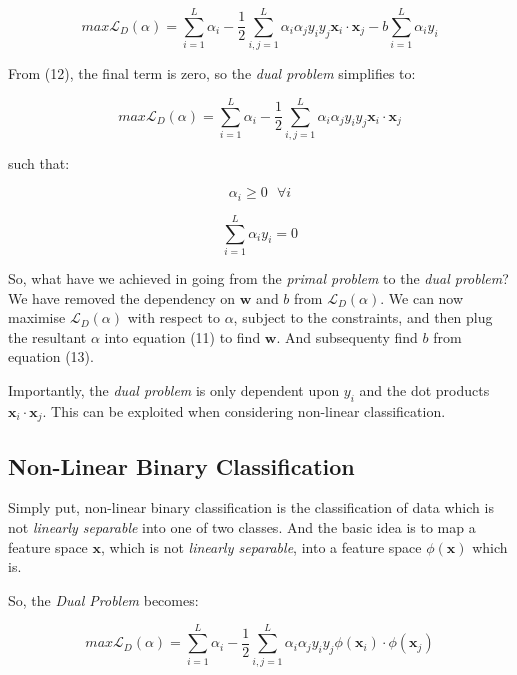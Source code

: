 \documentclass[10pt, a4paper,reqno]{amsart}
\begin{document}
\begin{equation}
max\mathcal{L}_D(\alpha) = \sum_{i=1}^{L}\alpha_i - \frac{1}{2}\sum_{i,j=1}^{L}\alpha_i \alpha_j y_i y_j\mathbf{x}_i\cdot\mathbf{x}_j - b\sum_{i=1}^{L}\alpha_i y_i
\end{equation}

From (12), the final term is zero, so the \emph{dual problem} simplifies to:

\begin{equation}
max\mathcal{L}_D(\alpha) = \sum_{i=1}^{L}\alpha_i - \frac{1}{2}\sum_{i,j=1}^{L}\alpha_i \alpha_j y_i y_j\mathbf{x}_i\cdot\mathbf{x}_j
\end{equation}

such that:

\begin{equation}
\alpha_i\geq0\text{ }\forall{i}
\end{equation}

\begin{equation}
\sum_{i=1}^{L}\alpha_i y_i = 0
\end{equation}

So, what have we achieved in going from the \emph{primal problem} to the \emph{dual problem}? We have removed the dependency on $\mathbf{w}$ and $b$ from $\mathcal{L}_D(\alpha)$. We can now maximise $\mathcal{L}_D(\alpha)$ with respect to $\alpha$, subject to the constraints, and then plug the resultant $\alpha$ into equation (11) to find $\mathbf{w}$. And subsequenty find $b$ from equation (13).

Importantly, the \emph{dual problem} is only dependent upon $y_i$ and the dot products $\mathbf{x}_i\cdot\mathbf{x}_j$. This can be exploited when considering non-linear classification.

\subsection{Non-Linear Binary Classification}

Simply put, non-linear binary classification is the classification of data which is not \emph{linearly separable} into one of two classes. And the basic idea is to map a feature space $\mathbf{x}$, which is not \emph{linearly separable}, into a feature space $\phi(\mathbf{x})$ which is.

So, the \emph{Dual Problem} becomes:

\begin{equation}
max\mathcal{L}_D(\alpha) = \sum_{i=1}^{L}\alpha_i - \frac{1}{2}\sum_{i,j=1}^{L}\alpha_i \alpha_j y_i y_j\phi(\mathbf{x}_i)\cdot\phi(\mathbf{x}_j)
\end{equation}
\end{document}
